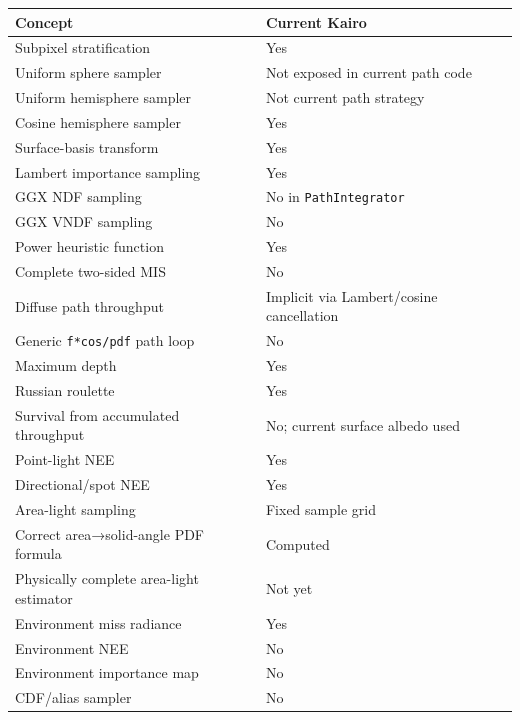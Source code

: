 {\def\LTcaptype{none} %
\begin{longtable}[]{@{}
  >{\raggedright\arraybackslash}p{}
  >{\raggedright\arraybackslash}p{}@{}}
\toprule\noalign{}
\begin{minipage}[b]{\linewidth}\raggedright
Concept
\end{minipage} & \begin{minipage}[b]{\linewidth}\raggedright
Current Kairo
\end{minipage} \\
\midrule\noalign{}
\endhead
\bottomrule\noalign{}
\endlastfoot
Subpixel stratification & Yes \\
Uniform sphere sampler & Not exposed in current path code \\
Uniform hemisphere sampler & Not current path strategy \\
Cosine hemisphere sampler & Yes \\
Surface-basis transform & Yes \\
Lambert importance sampling & Yes \\
GGX NDF sampling & No in \texttt{PathIntegrator} \\
GGX VNDF sampling & No \\
Power heuristic function & Yes \\
Complete two-sided MIS & No \\
Diffuse path throughput & Implicit via Lambert/cosine cancellation \\
Generic \texttt{f*cos/pdf} path loop & No \\
Maximum depth & Yes \\
Russian roulette & Yes \\
Survival from accumulated throughput & No; current surface albedo used \\
Point-light NEE & Yes \\
Directional/spot NEE & Yes \\
Area-light sampling & Fixed sample grid \\
Correct area→solid-angle PDF formula & Computed \\
Physically complete area-light estimator & Not yet \\
Environment miss radiance & Yes \\
Environment NEE & No \\
Environment importance map & No \\
CDF/alias sampler & No \\

\end{longtable}}
